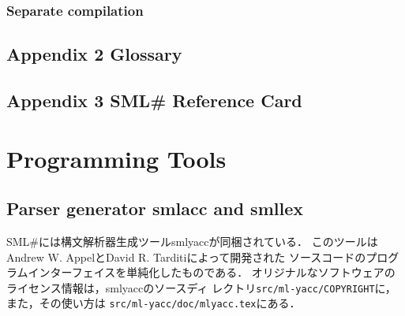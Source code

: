 \documentclass{jbook}
\newif\ifjp
\newcommand{\txt}[2]{#2}
\newcommand{\smlsharp}{SML\#}
\newcommand{\code}[1]{\mbox{\large\tt #1}}
\begin{document}
\section{\txt{分割コンパイル}{Separate compilation}}
\ifjp%
\else%
\fi%

% 
\chapter{\txt{付録２ 用語集}{Appendix 2 Glossary }}
\ifjp%
\else%
\fi%

% 
\chapter{\txt{付録３ 参照シート}{Appendix 3 \smlsharp{} Reference Card}}
\ifjp%
\else%
\fi%

% 
% 
\part{\txt{プログラミングツール}{Programming Tools}}
\label{part:tools}

\ifjp%
\else%
\fi%


\chapter{\txt{構文解析器生成ツール smlyaccとsmllex}{Parser generator smlacc and smllex}}
\ifjp%
	\smlsharp{}には構文解析器生成ツールsmlyaccが同梱されている．
	このツールはAndrew W. AppelとDavid R. Tarditiによって開発された
ソースコードのプログラムインターフェイスを単純化したものである．
	オリジナルなソフトウェアのライセンス情報は，smlyaccのソースディ
レクトリ\code{src/ml-yacc/COPYRIGHT}に，また，その使い方は
\code{src/ml-yacc/doc/mlyacc.tex}にある．
\end{document}
